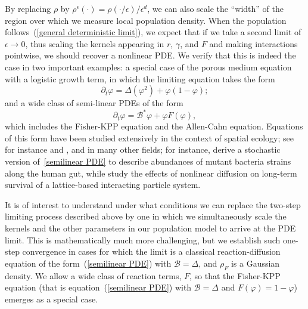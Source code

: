 \documentclass[12pt]{article}
\newcommand{\DG}{\mathcal{B}}  %
\numberwithin{equation}{section}
\begin{document}
By replacing $\rho$ by
$\rho^\epsilon(\cdot)=\rho(\cdot/\epsilon)/\epsilon^d$, 
we can also scale the ``width'' of the 
region over which we measure local population density. 
When the population follows~(\ref{general deterministic limit}), 
we expect that if we take a second limit of $\epsilon \to 0$,
thus scaling the kernels appearing in $r$, $\gamma$, and $F$ and making interactions pointwise,
we should recover a nonlinear PDE.
We verify that this is indeed the case in two important examples:
a special case of the porous medium equation with a logistic growth term, in which
the limiting equation takes the form 
\begin{equation}
	\label{PME1}
	\partial_t \varphi = \Delta (\varphi^2)+\varphi(1-\varphi);
\end{equation}
and a wide class of semi-linear PDEs of the form 
\begin{equation}
\label{semilinear PDE}
\partial_t \varphi = \DG^*\varphi+ \varphi F(\varphi),
\end{equation}
which includes the Fisher-KPP equation and the Allen-Cahn equation.
Equations of this form have been studied extensively
in the context of spatial ecology;
see for instance \citet{lam2023introduction} and \citet{cantrell2004spatial},
and in many other fields;
for instance, \citet{ghosh2022emergent}
derive a stochastic version of~\eqref{semilinear PDE} to describe abundances of mutant bacteria strains
along the human gut,
while \citet{li/buenzli/simpson:2022} study the effects of nonlinear diffusion
on long-term survival of a lattice-based interacting particle system.

It is of interest to understand under what conditions we can replace the two-step limiting
process described above by one in which we simultaneously scale the 
kernels
and the other parameters in 
our population model to arrive at the PDE limit.
This is mathematically much more challenging, but we establish such 
one-step convergence in cases for which the limit is a classical 
reaction-diffusion equation of the form~(\ref{semilinear PDE}) with 
$\DG=\Delta$,
and $\rho_F$ is a Gaussian density. We allow a wide class of reaction terms, $F$, so
that the Fisher-KPP equation 
(that is equation~(\ref{semilinear PDE}) with $\DG=\Delta$ and $F(\varphi)=1-\varphi$)
emerges as a special case.
\end{document}
